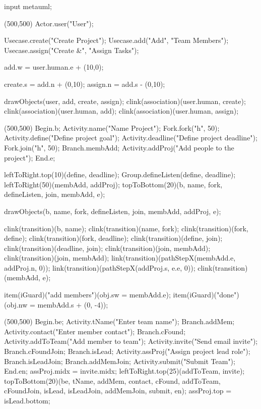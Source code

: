 \begin{empfile}
\begin{empcmds}
input metauml;
\end{empcmds}

\begin{empdef}[usecasediag](500,500)
  Actor.user("User");

  Usecase.create("Create Project");
  Usecase.add("Add", "Team Members");
  Usecase.assign("Create &", "Assign Tasks");

  add.w = user.human.e + (10,0);

  create.s = add.n + (0,10);
  assign.n = add.s - (0,10);
  
  
  drawObjects(user, add, create, assign);
  clink(association)(user.human, create);
  clink(association)(user.human, add);
  clink(association)(user.human, assign);
\end{empdef}

\begin{empdef}[activityR1](500,500)
Begin.b;
Activity.name("Name Project");
Fork.fork("h", 50);
Activity.define("Define project goal");
Activity.deadline("Define project deadline");
Fork.join("h", 50);
Branch.membAdd;
Activity.addProj("Add people to the project");
End.e;

leftToRight.top(10)(define, deadline);
Group.defineListen(define, deadline);
leftToRight(50)(membAdd, addProj);
topToBottom(20)(b, name, fork, defineListen, join, membAdd, e);



drawObjects(b, name, fork, defineListen, join, membAdd, addProj, e);

clink(transition)(b, name);
clink(transition)(name, fork);
clink(transition)(fork, define);
clink(transition)(fork, deadline);
clink(transition)(define, join);
clink(transition)(deadline, join);
clink(transition)(join, membAdd);
clink(transition)(join, membAdd);
link(transition)(pathStepX(membAdd.e, addProj.n, 0));
link(transition)(pathStepX(addProj.s, e.e, 0));
clink(transition)(membAdd, e);

item(iGuard)("add members")(obj.sw = membAdd.e);
item(iGuard)("done")(obj.nw = membAdd.s + (0, -4));
\end{empdef}

\begin{empdef}[activityR2](500,500)
Begin.be;
Activity.tName("Enter team name");
Branch.addMem;
Activity.contact("Enter member contact");
Branch.cFound;
Activity.addToTeam("Add member to team");
Activity.invite("Send email invite");
Branch.cFoundJoin;
Branch.isLead;
Activity.assProj("Assign project lead role");
Branch.isLeadJoin;
Branch.addMemJoin;
Activity.submit("Submit Team");
End.en;
assProj.midx = invite.midx;
leftToRight.top(25)(addToTeam, invite);
topToBottom(20)(be, tName, addMem, contact, cFound, addToTeam, cFoundJoin, isLead, isLeadJoin, addMemJoin, submit, en);
assProj.top = isLead.bottom;



\end{empdef}
\end{empfile}
